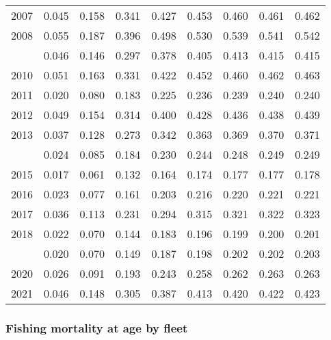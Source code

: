 \documentclass[
]{article}
\begin{document}
\begin{longtable}[t]{lrrrrrrrr}
2007 & 0.045 & 0.158 & 0.341 & 0.427 & 0.453 & 0.460 & 0.461 & 0.462\\
2008 & 0.055 & 0.187 & 0.396 & 0.498 & 0.530 & 0.539 & 0.541 & 0.542\\
\addlinespace
2009 & 0.046 & 0.146 & 0.297 & 0.378 & 0.405 & 0.413 & 0.415 & 0.415\\
2010 & 0.051 & 0.163 & 0.331 & 0.422 & 0.452 & 0.460 & 0.462 & 0.463\\
2011 & 0.020 & 0.080 & 0.183 & 0.225 & 0.236 & 0.239 & 0.240 & 0.240\\
2012 & 0.049 & 0.154 & 0.314 & 0.400 & 0.428 & 0.436 & 0.438 & 0.439\\
2013 & 0.037 & 0.128 & 0.273 & 0.342 & 0.363 & 0.369 & 0.370 & 0.371\\
\addlinespace
2014 & 0.024 & 0.085 & 0.184 & 0.230 & 0.244 & 0.248 & 0.249 & 0.249\\
2015 & 0.017 & 0.061 & 0.132 & 0.164 & 0.174 & 0.177 & 0.177 & 0.178\\
2016 & 0.023 & 0.077 & 0.161 & 0.203 & 0.216 & 0.220 & 0.221 & 0.221\\
2017 & 0.036 & 0.113 & 0.231 & 0.294 & 0.315 & 0.321 & 0.322 & 0.323\\
2018 & 0.022 & 0.070 & 0.144 & 0.183 & 0.196 & 0.199 & 0.200 & 0.201\\
\addlinespace
2019 & 0.020 & 0.070 & 0.149 & 0.187 & 0.198 & 0.202 & 0.202 & 0.203\\
2020 & 0.026 & 0.091 & 0.193 & 0.243 & 0.258 & 0.262 & 0.263 & 0.263\\
2021 & 0.046 & 0.148 & 0.305 & 0.387 & 0.413 & 0.420 & 0.422 & 0.423\\*
\end{longtable}

\hypertarget{fishing-mortality-at-age-by-fleet}{%
\subsubsection{Fishing mortality at age by
fleet}\label{fishing-mortality-at-age-by-fleet}}
\end{document}
